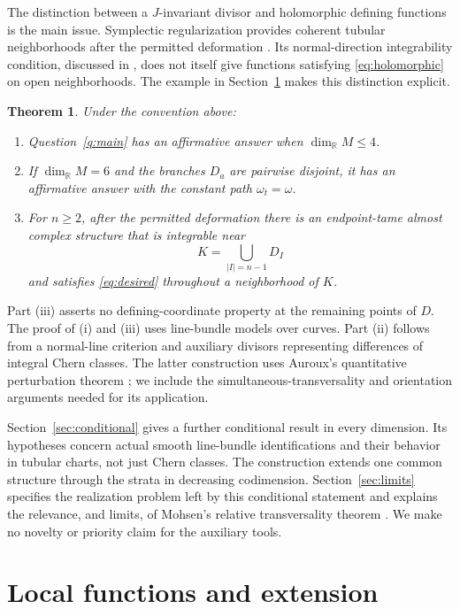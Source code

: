 \documentclass[11pt]{article}
\newtheorem{theorem}{Theorem}[section]
\theoremstyle{definition}
\theoremstyle{remark}
\newcommand{\R}{\mathbb R}
\begin{document}
The distinction between a $J$-invariant divisor and holomorphic defining functions is the main issue. Symplectic regularization provides coherent tubular neighborhoods after the permitted deformation \cite[Theorem 2.13]{TMZ}. Its normal-direction integrability condition, discussed in \cite[Section 1.1]{TMZ}, does not itself give functions satisfying \eqref{eq:holomorphic} on open neighborhoods. The example in Section~\ref{sec:local} makes this distinction explicit.

\begin{theorem}\label{thm:partial}
Under the convention above:
\begin{enumerate}[label=(\roman*),leftmargin=*]
\item Question~\ref{q:main} has an affirmative answer when $\dim_\R M\leq4$.
\item If $\dim_\R M=6$ and the branches $D_a$ are pairwise disjoint, it has an affirmative answer with the constant path $\omega_t=\omega$.
\item For $n\geq2$, after the permitted deformation there is an endpoint-tame almost complex structure that is integrable near
\[
 K=\bigcup_{|I|=n-1}D_I
\]
and satisfies \eqref{eq:desired} throughout a neighborhood of $K$.
\end{enumerate}
\end{theorem}
Part (iii) asserts no defining-coordinate property at the remaining points of $D$. The proof of (i) and (iii) uses line-bundle models over curves. Part (ii) follows from a normal-line criterion and auxiliary divisors representing differences of integral Chern classes. The latter construction uses Auroux's quantitative perturbation theorem \cite[Theorem 2]{Auroux}; we include the simultaneous-transversality and orientation arguments needed for its application.

Section~\ref{sec:conditional} gives a further conditional result in every dimension. Its hypotheses concern actual smooth line-bundle identifications and their behavior in tubular charts, not just Chern classes. The construction extends one common structure through the strata in decreasing codimension. Section~\ref{sec:limits} specifies the realization problem left by this conditional statement and explains the relevance, and limits, of Mohsen's relative transversality theorem \cite[p.~657]{Mohsen}. We make no novelty or priority claim for the auxiliary tools.

\section{Local functions and extension}\label{sec:local}
\end{document}
